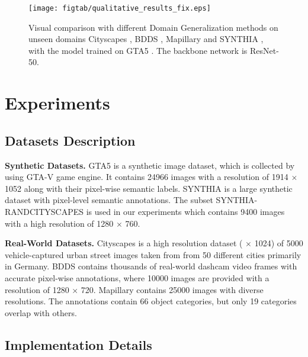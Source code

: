 \documentclass[10pt,twocolumn,letterpaper]{article}
\begin{document}
\begin{figure*}[t]
    \centering{}
     \texttt{[image: figtab/qualitative\_results\_fix.eps]} 
     \vspace{-6mm}
     \caption{Visual comparison with different Domain Generalization methods on unseen domains \ie Cityscapes \cite{cordts2016cityscapes}, BDDS \cite{yu2018bdd100k}, Mapillary \cite{neuhold2017mapillary} and SYNTHIA \cite{ros2016synthia}, with the model trained on GTA5 \cite{richter2016playing}. The backbone network is ResNet-50.}
    \label{fig5}\vspace{-5mm}
    
    \end{figure*}



\section{Experiments}

\subsection{Datasets Description}
\textbf{Synthetic Datasets.} {GTA5} \cite{richter2016playing} is a synthetic image dataset, which is  collected by using  GTA-V game engine. It contains 24966 images with a resolution of 1914 $\times$ 1052 along with their pixel-wise semantic labels. 
{SYNTHIA} \cite{ros2016synthia} is a large synthetic dataset with pixel-level semantic annotations. The subset {SYNTHIA-RANDCITYSCAPES} \cite{ros2016synthia} is used in our experiments which contains 9400 images with a high resolution of 1280 $\times$ 760.

\textbf{Real-World Datasets.} {Cityscapes} \cite{cordts2016cityscapes} is a high resolution dataset ( $\times$ 1024) of 5000 vehicle-captured urban street images taken from from 50 different cities primarily in Germany. {BDDS} \cite{yu2018bdd100k} contains thousands of real-world dashcam video frames with accurate pixel-wise annotations, where 10000 images are provided with a resolution of 1280 $\times$ 720. {Mapillary} \cite{neuhold2017mapillary} contains 25000 images with diverse resolutions. The annotations contain 66 object categories, but only 19 categories overlap with others. 


\subsection{Implementation Details \label{implementation}}
\end{document}
